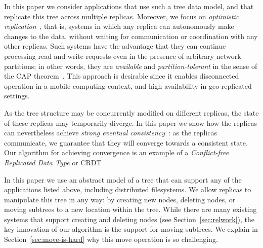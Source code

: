 \documentclass[sigconf]{acmart}
\begin{document}
In this paper we consider applications that use such a tree data model, and that replicate this tree across multiple replicas.
Moreover, we focus on \emph{optimistic replication}~\cite{Saito:2005jw}, that is, systems in which any replica can autonomously make changes to the data, without waiting for communication or coordination with any other replicas.
Such systems have the advantage that they can continue processing read and write requests even in the presence of arbitrary network partitions; in other words, they are \emph{available} and \emph{partition-tolerant} in the sense of the CAP theorem~\cite{Gilbert:2002il}.
This approach is desirable since it enables disconnected operation in a mobile computing context, and high availability in geo-replicated settings.

As the tree structure may be concurrently modified on different replicas, the state of these replicas may temporarily diverge.
In this paper we show how the replicas can nevertheless achieve \emph{strong eventual consistency}~\cite{Shapiro:2011un,Gomes:2017gy}: as the replicas communicate, we guarantee that they will converge towards a consistent state.
Our algorithm for achieving convergence is an example of a \emph{Conflict-free Replicated Data Type} or CRDT~\cite{Shapiro:2011wy,Shapiro:2011un}.

In this paper we use an abstract model of a tree that can support any of the applications listed above, including distributed filesystems.
We allow replicas to manipulate this tree in any way: by creating new nodes, deleting nodes, or moving subtrees to a new location within the tree.
While there are many existing systems that support creating and deleting nodes (see Section~\ref{sec:relwork}), the key innovation of our algorithm is the support for moving subtrees.
We explain in Section~\ref{sec:move-is-hard} why this move operation is so challenging.
\end{document}
